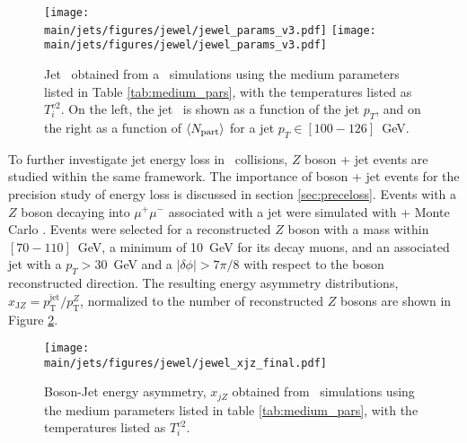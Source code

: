 \begin{figure}[!ht]
\centering
\texttt{[image: \\main/jets/figures/jewel/jewel\_params\_v3.pdf]}
\texttt{[image: \\main/jets/figures/jewel/jewel\_params\_v3.pdf]}
\caption{Jet \RAA\ obtained from a \jewel\ simulations using the medium parameters listed in Table \ref{tab:medium_pars}, with the temperatures listed as $T_{i}^{v2}$. On the left, the jet \RAA\ is shown as a function of the jet $p_T$, and on the right as a function of $\left\langle N_{\rm part} \right\rangle$ for a jet $p_T \in [100-126]$~GeV.}
\label{fig:jewel_raa_v3}
\end{figure}

To further investigate jet energy loss in \ArAr\ collisions, $Z$ boson + jet events are studied within the same \jewel framework.
The importance of boson + jet events for the precision study of energy loss is discussed in section \ref{sec:preceloss}.  %
Events with a $Z$ boson decaying into $\mu^+ \mu^-$ associated with a jet were simulated with \jewel + \pythia Monte Carlo \cite{KunnawalkamElayavalli:2016ttl}. Events were selected for a reconstructed $Z$ boson with a mass within $[70-110]$~GeV, a minimum \pt of 10~GeV for its decay muons, and an associated jet with a $p_T > 30$~GeV and a $|\delta \phi| > 7 \pi/8$ with respect to the boson reconstructed direction. The resulting energy asymmetry distributions, $x_{\mathrm{J}Z}=p_\mathrm{T}^{\textrm{jet}}/p_\mathrm{T}^{Z}$, normalized to the number of reconstructed $Z$ bosons are shown in Figure \ref{fig:jewel_xjz}.%

\begin{figure}[!ht]
\centering
\texttt{[image: \\main/jets/figures/jewel/jewel\_xjz\_final.pdf]}
\caption{Boson-Jet energy asymmetry, $x_{jZ}$ obtained from \jewel\ simulations using the medium parameters listed in table \ref{tab:medium_pars}, with the temperatures listed as $T_{i}^{v2}$.}
\label{fig:jewel_xjz}
\end{figure}

